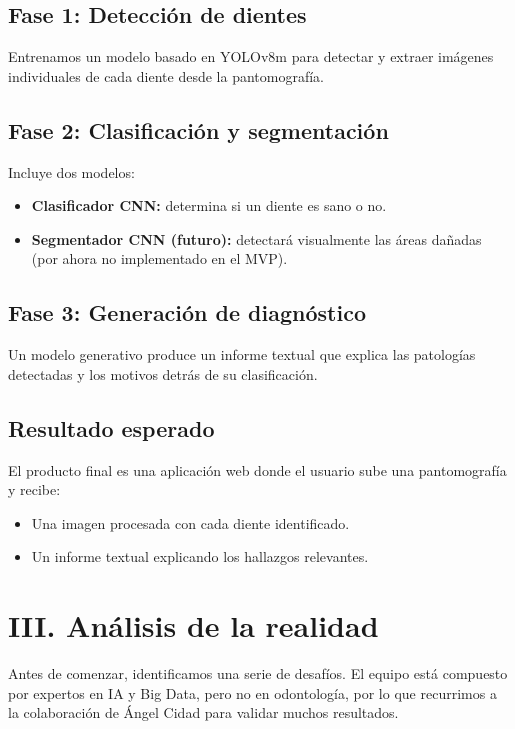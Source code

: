 \documentclass[a4paper,12pt]{article}
\begin{document}
\subsection*{Fase 1: Detección de dientes}
Entrenamos un modelo basado en YOLOv8m para detectar y extraer imágenes individuales de cada diente desde la pantomografía.

\subsection*{Fase 2: Clasificación y segmentación}
Incluye dos modelos:

\begin{itemize}
    \item \textbf{Clasificador CNN:} determina si un diente es sano o no.
    \item \textbf{Segmentador CNN (futuro):} detectará visualmente las áreas dañadas (por ahora no implementado en el MVP).
\end{itemize}

\subsection*{Fase 3: Generación de diagnóstico}
Un modelo generativo produce un informe textual que explica las patologías detectadas y los motivos detrás de su clasificación.

\subsection*{Resultado esperado}

El producto final es una aplicación web donde el usuario sube una pantomografía y recibe:

\begin{itemize}
    \item Una imagen procesada con cada diente identificado.
    \item Un informe textual explicando los hallazgos relevantes.
\end{itemize}

\section*{III. Análisis de la realidad}

Antes de comenzar, identificamos una serie de desafíos. El equipo está compuesto por expertos en IA y Big Data, pero no en odontología, por lo que recurrimos a la colaboración de Ángel Cidad para validar muchos resultados.
\end{document}
